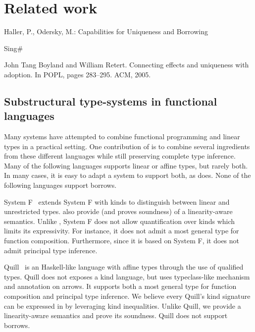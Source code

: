 \section{Related work}
\label{sec:related-work}
Haller, P., Odersky, M.: Capabilities for Uniqueness and Borrowing
\cite{DBLP:conf/ecoop/HallerO10}

Sing\#

John Tang Boyland and William Retert. Connecting effects and
uniqueness with adoption. In POPL, pages 283–295. ACM, 2005.
\cite{DBLP:conf/popl/BoylandR05}


\subsection{Substructural type-systems in functional languages}

Many systems have attempted to combine
functional programming and linear types in a practical setting.
One contribution of \lang is to combine several ingredients
from these different languages while still preserving
complete type inference.
Many of the following languages supports linear or affine types, but rarely
both. In many cases, it is easy to adapt a system to support both, as
\lang does.
None of the following languages support borrows.

System F\degree~\citep{DBLP:conf/tldi/MazurakZZ10}
extends System F with kinds to distinguish
between linear and unrestricted types.
\citet{DBLP:conf/tldi/MazurakZZ10} also provide
(and proves soundness) of a linearity-aware semantics.
Unlike \lang, System F\degree{} does not allow
quantification over kinds which limits its expressivity. For instance, it
does not admit a most general type for function composition.
Furthermore, since it is based on System F, it does not admit
principal type inference.

Quill~\citep{DBLP:conf/icfp/Morris16} is an Haskell-like language with affine
types through the use of qualified types.
Quill does not exposes a kind language, but
uses typeclass-like mechanism and annotation on arrows.
It supports both a most general type for function composition and
principal type inference.
We believe every Quill's kind signature can be expressed in \lang by leveraging
kind inequalities.
Unlike Quill,
we provide a linearity-aware semantics and prove its soundness.
Quill does not support borrows.


